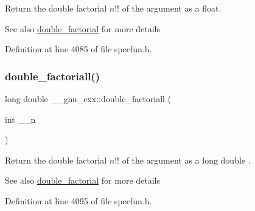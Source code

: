 Return the double factorial $ n!! $ of the argument as a {\ttfamily float}.

\begin{DoxySeeAlso}{See also}
\hyperlink{group__gnu__math__spec__func_ga1e62c47f84f9782828f8830b4fedc13c}{double\+\_\+factorial} for more details 
\end{DoxySeeAlso}


Definition at line 4085 of file specfun.\+h.

\mbox{\label{group__gnu__math__spec__func_ga0366730a4a775256217ef1cd9d0c3a04}} 
\subsubsection{\texorpdfstring{double\+\_\+factoriall()}{double\_factoriall()}}
{\footnotesize\ttfamily long double \+\_\+\+\_\+gnu\+\_\+cxx\+::double\+\_\+factoriall (\begin{DoxyParamCaption}\item[{int}]{\+\_\+\+\_\+n }\end{DoxyParamCaption})\hspace{0.3cm}{\ttfamily [inline]}}

Return the double factorial $ n!! $ of the argument as a {\ttfamily  long double }.

\begin{DoxySeeAlso}{See also}
\hyperlink{group__gnu__math__spec__func_ga1e62c47f84f9782828f8830b4fedc13c}{double\+\_\+factorial} for more details 
\end{DoxySeeAlso}


Definition at line 4095 of file specfun.\+h.

\mbox{\label{group__gnu__math__spec__func_ga6e44a0d90500e56ef4b3aba6efd7e2b0}} 
